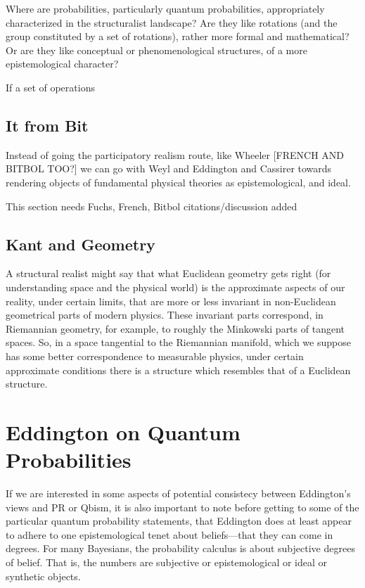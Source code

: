 \documentclass{article}
\begin{document}
Where are probabilities, particularly quantum probabilities, appropriately characterized in the structuralist landscape?  Are they like rotations (and the group constituted by a set of rotations), rather more formal and mathematical?  Or are they like conceptual or phenomenological structures, of a more epistemological character?  

If a set of operations 






\subsection{It from Bit}

Instead of going the participatory realism route, like Wheeler [FRENCH AND BITBOL TOO?] we can go with Weyl and Eddington and Cassirer towards rendering objects of fundamental physical theories as epistemological, and ideal.

This section needs Fuchs, French, Bitbol citations/discussion added

\subsection{Kant and Geometry}

A structural realist might say that what Euclidean geometry gets right (for understanding space and the physical world) is the approximate aspects of our reality, under certain limits, that are more or less invariant in non-Euclidean geometrical parts of modern physics.  These invariant parts correspond, in Riemannian geometry, for example, to roughly the Minkowski parts of tangent spaces.  So, in a space tangential to the Riemannian manifold, which we suppose has some better correspondence to measurable physics, under certain approximate conditions there is a structure which resembles that of a Euclidean structure.




\section{Eddington on Quantum Probabilities}

If we are interested in some aspects of potential consistecy between Eddington's views and PR or Qbism, it is also important to note before getting to some of the particular quantum probability statements, that Eddington does at least appear to adhere to one epistemological tenet about beliefs---that they can come in degrees.  For many Bayesians, the probability calculus is about subjective degrees of belief.  That is, the numbers are subjective or epistemological or ideal or synthetic objects.
\end{document}
